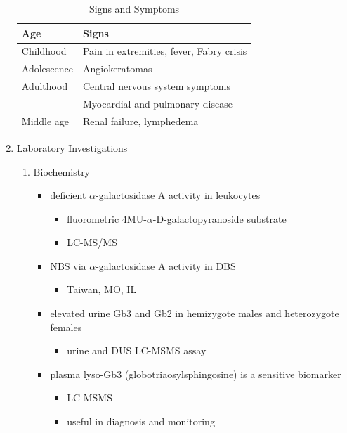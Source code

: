 \documentclass{scrartcl}
\begin{document}
\begin{enumerate}
\begin{table}[htbp]
\caption{\label{tab:org5e5c3d3}
Signs and Symptoms}
\centering
\begin{tabular}{ll}
Age & Signs\\
\hline
Childhood & Pain in extremities, fever, Fabry crisis \footnotemark\\
Adolescence & Angiokeratomas\\
Adulthood & Central nervous system symptoms\\
 & Myocardial and pulmonary disease\\
Middle age & Renal failure, lymphedema\\
\end{tabular}
\end{table}


\item Laboratory Investigations
\label{sec:org73da720}
\begin{enumerate}
\item Biochemistry
\label{sec:org741df26}
\begin{itemize}
\item deficient \(\alpha\)-galactosidase A activity in leukocytes
\begin{itemize}
\item fluorometric 4MU-\(\alpha\)-D-galactopyranoside substrate
\item LC-MS/MS
\end{itemize}
\item NBS via \(\alpha\)-galactosidase A activity in DBS
\begin{itemize}
\item Taiwan, MO, IL
\end{itemize}
\item elevated urine Gb3 and Gb2 in hemizygote males and heterozygote females
\begin{itemize}
\item urine and DUS LC-MSMS assay
\end{itemize}
\item plasma lyso-Gb3 (globotriaosylsphingosine) is a sensitive biomarker
\begin{itemize}
\item LC-MSMS
\item useful in diagnosis and monitoring
\end{itemize}
\end{itemize}


\end{enumerate}
\end{enumerate}
\end{document}
